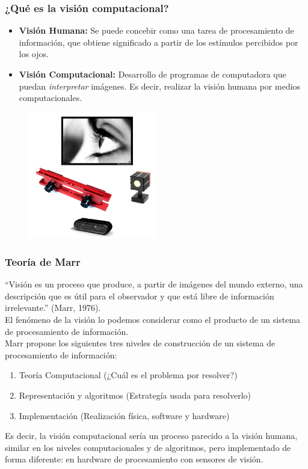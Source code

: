 \begin{frame}\frametitle{¿Qué es la visión computacional?}
  \begin{itemize}
  \item \textbf{Visión Humana: } Se puede concebir como una tarea de procesamiento de información, que obtiene significado a partir de los estímulos percibidos por los ojos.
  \item \textbf{Visión Computacional: } Desarrollo de programas de computadora que puedan \textit{interpretar} imágenes. Es decir, realizar la visión humana por medios computacionales. 
  \end{itemize}
  \begin{figure}
    \centering
    \includegraphics[width=0.5\textwidth]{Figures/VisionConcept.png}
  \end{figure}
\end{frame}

\begin{frame}\frametitle{Teoría de Marr}
“Visión es un proceso que produce, a partir de imágenes del mundo externo, una descripción que es útil para el observador y que está libre de información irrelevante.” (Marr, 1976).\\
El fenómeno de la visión lo podemos considerar como el producto de un sistema de procesamiento de información.\\

Marr propone los siguientes tres niveles de construcción de un sistema de procesamiento de información:\\
\begin{enumerate}
\item Teoría Computacional (¿Cuál es el problema por resolver?)
\item Representación y algoritmos (Estrategía usada para resolverlo)
\item Implementación (Realización física, software y hardware)
\end{enumerate}
Es decir, la visión computacional sería un proceso parecido a la visión humana, similar en los niveles computacionales y de algoritmos, pero implementado de forma diferente: en hardware de procesamiento con sensores de visión. 
\end{frame}

